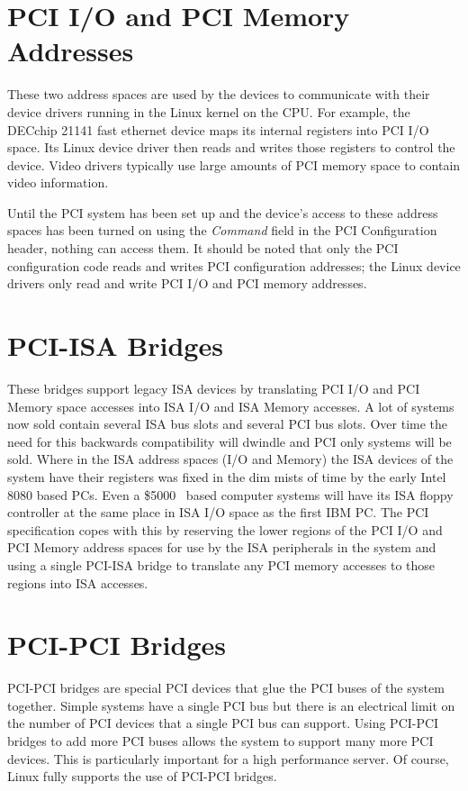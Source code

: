 \section{PCI I/O and PCI Memory Addresses}
These two address spaces are used by the devices to communicate
with their device drivers running in the Linux kernel on the CPU.
For example, the DECchip 21141 fast ethernet device maps its
internal registers into PCI I/O space.
Its Linux device driver then reads and writes those registers to control
the device.
Video drivers typically use large amounts of PCI memory space
to contain video information.

Until the PCI system has been set up and the device's access to
these address spaces has been turned on using the {\em Command} 
field in the PCI Configuration header, nothing can access them.
It should be noted that only the PCI configuration code reads
and writes PCI configuration addresses; the Linux device drivers 
only read and write PCI I/O and PCI memory addresses.

\section{PCI-ISA Bridges}
These bridges support legacy ISA devices by translating PCI I/O and PCI Memory
space accesses into ISA I/O and ISA Memory accesses.
A lot of systems now sold contain several ISA bus slots and several PCI bus slots.
Over time the need for this backwards compatibility will dwindle and PCI only
systems will be sold.
Where in the ISA address spaces (I/O and Memory) the ISA devices of the
system have their registers was fixed in the dim mists of time by the
early Intel 8080 based PCs.
Even a \$5000 \axp\ based computer systems  will have its ISA floppy controller
at the same place in ISA I/O space as the first IBM PC.
The PCI specification copes with this by reserving the lower regions
of the PCI I/O and PCI Memory address spaces for use by the ISA peripherals
in the system and using a single PCI-ISA bridge to translate any PCI memory
accesses to those regions into ISA accesses.

\section{PCI-PCI Bridges}
PCI-PCI bridges are special PCI devices that glue the PCI buses of the system together.
Simple systems have a single PCI bus but there is an
electrical limit on the number of PCI devices that a single
PCI bus can support.
Using PCI-PCI bridges to add more PCI buses allows the system
to support many more PCI devices.
This is particularly important for a high performance server.
Of course, Linux fully supports the use of PCI-PCI bridges.

